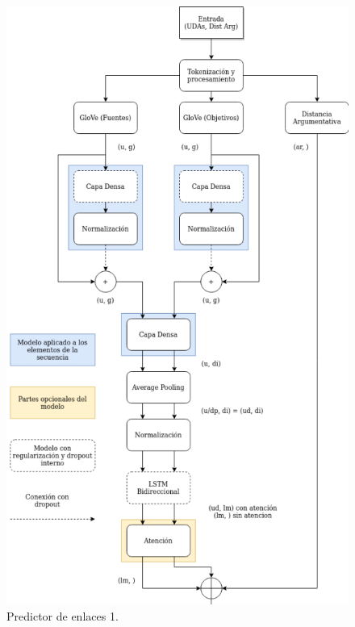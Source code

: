\begin{figure}[p]
    \begin{center}
        \includegraphics[scale=.6]{Graphics/Modelo_Link_Prediction1.png}
        \caption{Predictor de enlaces 1.}\label{fig:link_predictor_model1}
    \end{center}
\end{figure}
